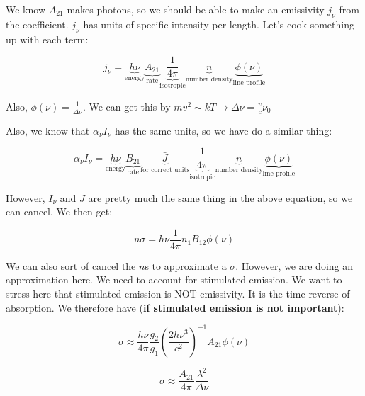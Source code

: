 \documentclass{article}
\begin{document}
We know $A_{21}$ makes photons, so we should be able to make an emissivity $j_\nu$ from the coefficient. $j_\nu$ has units of specific intensity per length. Let's cook something up with each term:

\begin{equation}
    j_\nu = \underbrace{h\nu}_{\text{energy}} \underbrace{A_{21}}_{\text{rate}} \underbrace{\frac{1}{4\pi}}_{\text{isotropic}} \underbrace{n}_{\text{number density}} \underbrace{\phi(\nu)}_{\text{line profile}}
\end{equation}

Also, $\phi(\nu) = \frac{1}{\Delta \nu}$. We can get this by $mv^2 \sim kT \rightarrow \Delta \nu = \frac{v}{c}\nu_0$

Also, we know that $\alpha_\nu I_\nu$ has the same units, so we have do a similar thing:

\begin{equation}
    \alpha_\nu I_\nu = \underbrace{h\nu}_{\text{energy}} \underbrace{B_{21}}_{\text{rate}}
    \underbrace{\bar{J}}_{\text{for correct units}}\underbrace{\frac{1}{4\pi}}_{\text{isotropic}} \underbrace{n}_{\text{number density}} \underbrace{\phi(\nu)}_{\text{line profile}}
\end{equation}

However, $I_\nu$ and $\bar{J}$ are pretty much the same thing in the above equation, so we can cancel. We then get:

\begin{equation}
    n \sigma = h\nu \frac{1}{4\pi} n_1 B_{12} \phi(\nu)
\end{equation}

We can also sort of cancel the $n$s to approximate a $\sigma$. However, we are doing an approximation here. We need to account for stimulated emission. We want to stress here that stimulated emission is NOT emissivity. It is the time-reverse of absorption. We therefore have (\textbf{if stimulated emission is not important}):

\begin{equation}
    \sigma \approx \frac{h \nu}{4\pi} \frac{g_2}{g_1} \left(\frac{2h\nu^3}{c^2}\right)^{-1} A_{21} \phi(\nu)
\end{equation}

\begin{equation}
    \boxed{\sigma \approx \frac{A_{21}}{4\pi} \frac{\lambda^2}{\Delta \nu}}
\end{equation}
\end{document}
